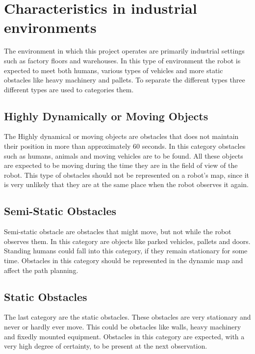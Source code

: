 \section{Characteristics in industrial environments}
The environment in which this project operates are primarily industrial settings such as factory floors and warehouses. 
In this type of environment the robot is expected to meet both humans, various types of vehicles and more static obstacles like heavy machinery and pallets. To separate the different types three different types are used to categories them. 

\subsection{Highly Dynamically or Moving Objects}
The Highly dynamical or moving objects are obstacles that does not maintain their position in more than approximately 60 seconds. 
In this category obstacles such as humans, animals and moving vehicles are to be found. All these objects are expected to be moving during the time they are in the field of view of the robot.
This type of obstacles should not be represented on a robot's map, since it is very unlikely that they are at the same place when the robot observes it again. 

\subsection{Semi-Static Obstacles}
Semi-static obstacle are obstacles that might move, but not while the robot observes them. In this category are objects like parked vehicles, pallets and doors. Standing humans could fall into this category, if they remain stationary for some time.
Obstacles in this category should be represented in the dynamic map and affect the path planning. 

\subsection{Static Obstacles}
The last category are the static obstacles. 
These obstacles are very stationary and never or hardly ever move. This could be obstacles like walls, heavy machinery and fixedly mounted equipment. 
Obstacles in this category are expected, with a very high degree of certainty, to be present at the next observation. 